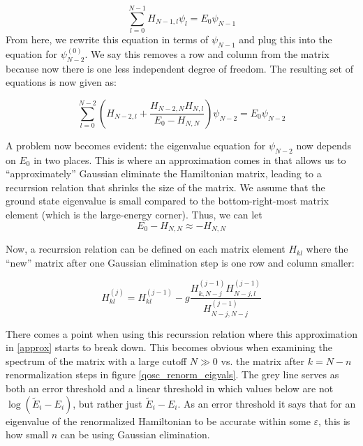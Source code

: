 \documentclass[%
 reprint,
nofootinbib,
 amsmath,amssymb,
 aps,
]{revtex4-2}
\numberwithin{equation}{section}
\begin{document}
\begin{equation}
  \sum_{l = 0}^{N - 1} H_{N - 1, l}\psi_l = E_0\psi_{N - 1}
\end{equation}
From here, we rewrite this equation in terms of $\psi_{N - 1}$ and plug this into the equation
for $\psi^{(0)}_{N - 2}$. We say this removes a row and column from the matrix because now
there is one less independent degree of freedom. The resulting set of equations is now given
as:

\begin{equation}
  \sum_{l = 0}^{N - 2}\left(H_{N-2, l} + \frac{H_{N-2, N}H_{N, l}}{E_0 - H_{N, N}} \right)\psi_{N - 2} = E_0\psi_{N - 2}
\end{equation}

A problem now becomes evident: the eigenvalue equation for $\psi_{N - 2}$ now depends on $E_0$ in two places.
This is where an approximation comes in that allows us to ``approximately'' Gaussian eliminate the
Hamiltonian matrix, leading to a recurrsion relation that shrinks the size of the matrix. We assume
that the ground state eigenvalue is small compared to the bottom-right-most matrix element (which 
is the large-energy corner). Thus, we can let
\begin{equation}
  E_0 - H_{N, N} \approx -H_{N, N}
  \label{approx}
\end{equation}

Now, a recurrsion relation can be defined on each matrix element $H_{kl}$ where the ``new'' matrix
after one Gaussian elimination step is one row and column smaller:

\begin{equation}
  \label{recurrsion}
  H_{kl}^{(j)} = H_{kl}^{(j - 1)} - g\frac{H_{k,N-j}^{(j - 1)}H_{N-j,l}^{(j - 1)}}{H_{N-j,N-j}^{(j - 1)}}
\end{equation}

There comes a point when using this recurssion relation where this approximation in \ref{approx} starts to break down. This becomes obvious when examining the spectrum of the matrix with a large cutoff $N \gg 0$ vs. the matrix after $k = N - n$ renormalization steps in figure \ref{qosc_renorm_eigvals}.
The grey line serves as both an error threshold and a linear threshold in which values below are not $\log(\tilde{E}_i - E_i)$, but rather just $\tilde{E}_i - E_i$. As an error threshold it says that for an eigenvalue of the renormalized Hamiltonian to be accurate within some $\varepsilon$, this is how small $n$ can be using Gaussian elimination.
\end{document}
